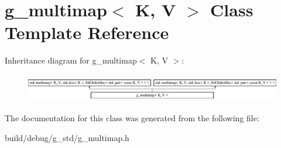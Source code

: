 \hypertarget{classg__multimap}{\section{g\-\_\-multimap$<$ K, V $>$ Class Template Reference}
\label{classg__multimap}
}
Inheritance diagram for g\-\_\-multimap$<$ K, V $>$\-:\begin{figure}[H]
\begin{center}
\leavevmode
\includegraphics[height=1.228070cm]{classg__multimap}
\end{center}
\end{figure}


The documentation for this class was generated from the following file\-:\begin{DoxyCompactItemize}
\item 
build/debug/g\-\_\-std/g\-\_\-multimap.\-h\end{DoxyCompactItemize}
